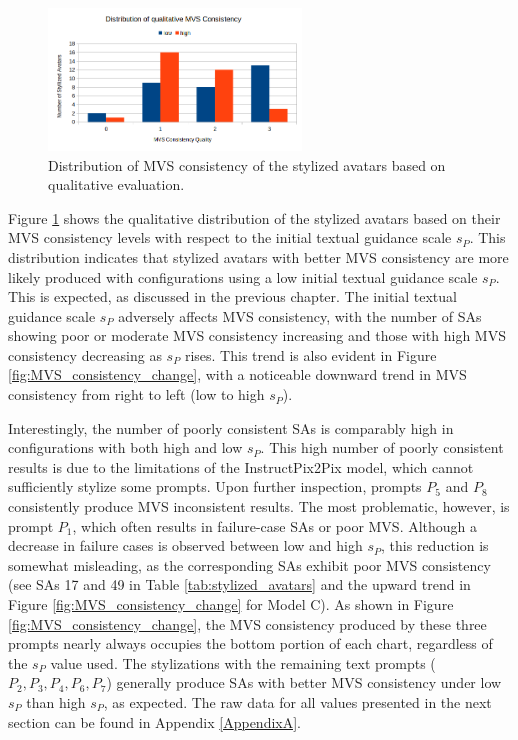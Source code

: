 \begin{figure}[ht]
	\centering
	\includegraphics[width=0.6\textwidth]{Figures/results/qualitative distribution.png}
	\caption{Distribution of MVS consistency of the stylized avatars based on qualitative evaluation.}
	\label{fig:qualitative_distribution}
\end{figure}

Figure \ref{fig:qualitative_distribution} shows the qualitative distribution of the stylized avatars based on their MVS consistency levels with respect to the initial textual guidance scale $s_P$. This distribution indicates that stylized avatars with better MVS consistency are more likely produced with configurations using a low initial textual guidance scale $s_P$. This is expected, as discussed in the previous chapter. The initial textual guidance scale $s_P$ adversely affects MVS consistency, with the number of SAs showing poor or moderate MVS consistency increasing and those with high MVS consistency decreasing as $s_P$ rises. This trend is also evident in Figure \ref{fig:MVS_consistency_change}, with a noticeable downward trend in MVS consistency from right to left (low to high $s_P$).

Interestingly, the number of poorly consistent SAs is comparably high in configurations with both high and low $s_P$. This high number of poorly consistent results is due to the limitations of the InstructPix2Pix model, which cannot sufficiently stylize some prompts. Upon further inspection, prompts $P_5$ and $P_8$ consistently produce MVS inconsistent results. The most problematic, however, is prompt $P_1$, which often results in failure-case SAs or poor MVS. Although a decrease in failure cases is observed between low and high $s_P$, this reduction is somewhat misleading, as the corresponding SAs exhibit poor MVS consistency (see SAs 17 and 49 in Table \ref{tab:stylized_avatars} and the upward trend in Figure \ref{fig:MVS_consistency_change} for Model C). As shown in Figure \ref{fig:MVS_consistency_change}, the MVS consistency produced by these three prompts nearly always occupies the bottom portion of each chart, regardless of the $s_P$ value used. The stylizations with the remaining text prompts ($P_2, P_3, P_4, P_6, P_7$) generally produce SAs with better MVS consistency under low $s_P$ than high $s_P$, as expected. The raw data for all values presented in the next section can be found in Appendix \ref{AppendixA}.

